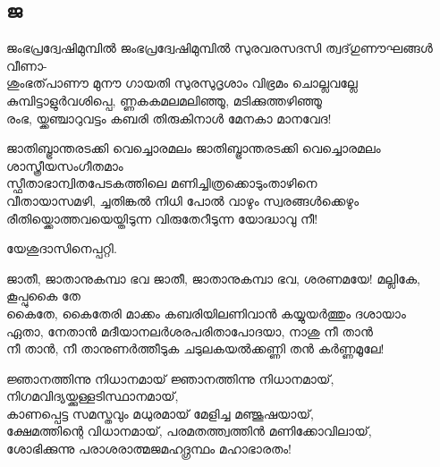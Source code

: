 \subsection{ജ}
\begin{enumerate}




\begin{slokam}{\VSr}{\Punam}{ജംഭപ്രദ്വേഷിമുമ്പിൽ}
ജംഭപ്രദ്വേഷിമുമ്പിൽ സുരവരസദസി ത്വദ്‌ഗുണൗഘങ്ങള്‍ വീണാ-\\
ശുംഭത്‌പാണൗ മുനൗ ഗായതി സുരസുദൃശാം വിഭ്രമം ചൊല്ലവല്ലേ\\
കുമ്പിട്ടാളുർവശിപ്പെ, ണ്ണകകമലമലിഞ്ഞൂ, മടിക്കുത്തഴിഞ്ഞൂ\\
രംഭ, യ്ക്കഞ്ചാറുവട്ടം കബരി തിരുകിനാള്‍ മേനകാ മാനവേദ!
\end{slokam}




\begin{slokam}{\VSv}{\UN}{ജാതിബ്ഭ്രാന്തരടക്കി വെച്ചൊരമലം}
ജാതിബ്ഭ്രാന്തരടക്കി വെച്ചൊരമലം ശാസ്ത്രീയസംഗീതമാം\\
സ്ഫീതാഭാന്വിതപേടകത്തിലെ മണിച്ചിത്രക്കൊടുംതാഴിനെ\\
വീതായാസമഴി, ച്ചതിങ്കൽ നിധി പോൽ വാഴും സ്വരങ്ങൾക്കെഴും \\
രീതിയ്ക്കൊത്തവയെയ്തിടുന്ന വിരുതേറീടുന്ന യോദ്ധാവു  നീ!
\end{slokam}


യേശുദാസിനെപ്പറ്റി.

\begin{slokam}{\VSr}{\KVPR}{ജാതീ, ജാതാനുകമ്പാ ഭവ}
ജാതീ, ജാതാനുകമ്പാ ഭവ, ശരണമയേ! മല്ലികേ, കൂപ്പുകൈ തേ\\
കൈതേ, കൈതേരി മാക്കം കബരിയിലണിവാൻ കയ്യുയർത്തും ദശായാം\\
ഏതാ, നേതാൻ മദീയാനലർശരപരിതാപോദയാ, നാശു നീ താൻ\\
നീ താൻ, നീ താനുണർത്തീടുക ചടുലകയൽക്കണ്ണി തൻ കർണ്ണമൂലേ!
\end{slokam}



\begin{slokam}{\VSv}{\DSN}{ജ്ഞാനത്തിന്നു നിധാനമായ്}
ജ്ഞാനത്തിന്നു നിധാനമായ്, നിഗമവിദ്യയ്ക്കുള്ളടിസ്ഥാനമായ്,\\
കാണപ്പെട്ട സമസ്തവും മധുരമായ് മേളിച്ച മഞ്ജൂഷയായ്,\\
ക്ഷേമത്തിന്റെ വിധാനമായ്, പരമതത്ത്വത്തിൻ മണിക്കോവിലായ്,\\
ശോഭിക്കുന്നു പരാശരാത്മജമഹദ്ഗ്രന്ഥം മഹാഭാരതം!
\end{slokam}


\end{enumerate}
